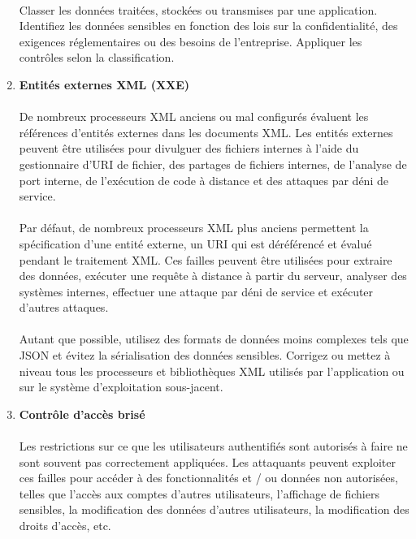 \begin{enumerate}
	\paragraph{}
	Classer les données traitées, stockées ou transmises par une application. Identifiez les données sensibles en fonction des lois sur la confidentialité, des exigences réglementaires ou des besoins de l'entreprise.
	Appliquer les contrôles selon la classification.

	\vspace*{0.8cm} \item \textbf{Entités externes XML (XXE)} \vspace*{-0.4cm}
	\paragraph{}
	De nombreux processeurs XML anciens ou mal configurés évaluent les références d'entités externes dans les documents XML. Les entités externes peuvent être utilisées pour divulguer des fichiers internes à l'aide du gestionnaire d'URI de fichier, des partages de fichiers internes, de l'analyse de port interne, de l'exécution de code à distance et des attaques par déni de service.
	\paragraph{}
	Par défaut, de nombreux processeurs XML plus anciens permettent la spécification d'une entité externe, un URI qui est déréférencé et évalué pendant le traitement XML. 
	Ces failles peuvent être utilisées pour extraire des données, exécuter une requête à distance à partir du serveur, analyser des systèmes internes, effectuer une attaque par déni de service et exécuter d'autres attaques.
	\paragraph{}
	Autant que possible, utilisez des formats de données moins complexes tels que JSON et évitez la sérialisation des données sensibles.
	Corrigez ou mettez à niveau tous les processeurs et bibliothèques XML utilisés par l'application ou sur le système d'exploitation sous-jacent.

	\vspace*{0.8cm} \item \textbf{Contrôle d'accès brisé} \vspace*{-0.4cm}
	\paragraph{}
	Les restrictions sur ce que les utilisateurs authentifiés sont autorisés à faire ne sont souvent pas correctement appliquées. Les attaquants peuvent exploiter ces failles pour accéder à des fonctionnalités et / ou données non autorisées, telles que l'accès aux comptes d'autres utilisateurs, l'affichage de fichiers sensibles, la modification des données d'autres utilisateurs, la modification des droits d'accès, etc.

\end{enumerate}

